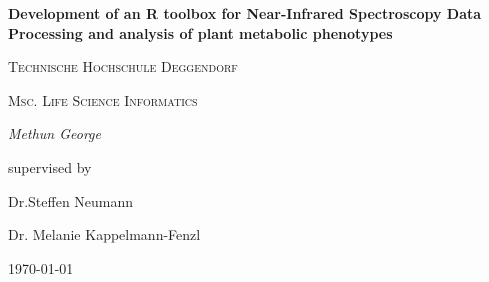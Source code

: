 \documentclass[12pt,a4paper]{report}
\begin{document}
\begin{titlepage}
	\centering
	
	
	{\huge\bfseries Development of an R toolbox for Near-Infrared Spectroscopy Data Processing 
    and analysis of plant metabolic phenotypes\par}
	\vspace{2cm}
    {\LARGE \textsc{Technische Hochschule Deggendorf}\par}
	\vspace{1cm}
	{\Large \textsc{Msc. Life Science Informatics}\par}
	\vspace{1.5cm}
	{\Large\itshape Methun George\par}
	\vfill
	supervised by\par
	Dr.Steffen Neumann\par
    Dr. Melanie Kappelmann-Fenzl

	\vfill

	{\large \today\par}
\end{titlepage}
\end{document}
